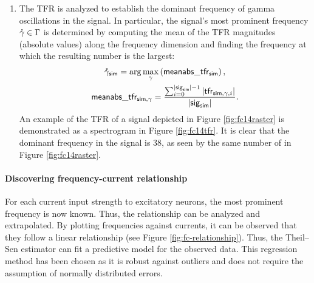 \begin{enumerate}
    \item The TFR is analyzed to establish the dominant frequency of gamma oscillations in the signal. In particular, the signal's most prominent frequency $\mathring{\gamma} \in \Gamma$ is determined by computing the mean of the TFR magnitudes (absolute values) along the frequency dimension and finding the frequency at which the resulting number is the largest:
    \begin{equation}
    \begin{gathered}
        \mathring{\gamma}_{\mathsf{sim}} = \arg \max_\gamma \left(
            \mathsf{meanabs}\_\mathsf{tfr}_{\mathsf{sim}}
        \right),
        \\
        \mathsf{meanabs}\_\mathsf{tfr}_{\mathsf{sim}, \gamma} = 
        \frac{
            \sum_{i=0}^{|\mathsf{sig}_{\mathsf{sim}}| - 1} 
            |\mathsf{tfr}_{\mathsf{sim}, \gamma, i}|
        }{
           |\mathsf{sig}_{\mathsf{sim}}|
        }.
    \end{gathered}
    \end{equation}
    An example of the TFR of a signal depicted in Figure \ref{fig:fc14raster} is demonstrated as a spectrogram in Figure \ref{fig:fc14tfr}. It is clear that the dominant frequency in the signal is 38, as seen by the same number of  in Figure \ref{fig:fc14raster}.
\end{enumerate}


\paragraph{Discovering frequency-current relationship}

For each current input strength to excitatory neurons, the most prominent frequency is now known. Thus, the relationship can be analyzed and extrapolated. By plotting frequencies against currents, it can be observed that they follow a linear relationship (see Figure \ref{fig:fc-relationship}). Thus, the Theil–Sen estimator can fit a predictive model for the observed data. This regression method has been chosen as it is robust against outliers and does not require the assumption of normally distributed errors. 

